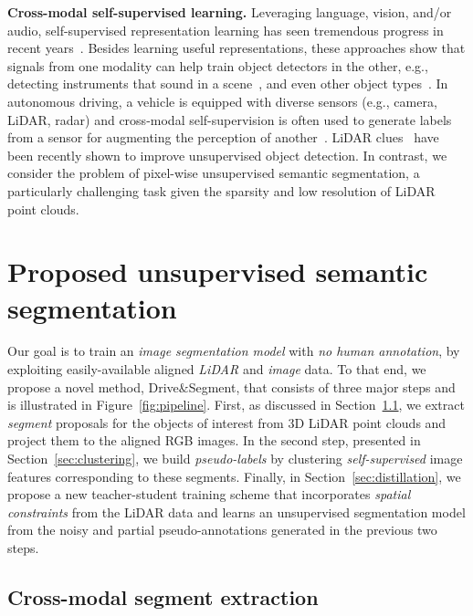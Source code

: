 \documentclass[runningheads]{llncs}
\newcommand{\ours}{Drive$\&$Segment\xspace}
\newcommand{\paragraphcustom}[1]{\smallskip\noindent\textbf{#1}}
\begin{document}
\paragraphcustom{Cross-modal self-supervised learning.}
Leveraging language, vision, and/or audio,  self-supervised representation learning has seen tremendous progress in recent years~\cite{alayrac2020self,alwassel_2020_xdc,arandjelovic2017look,miech2020end,owens2018audio,Recasens_2021_ICCV,zhao2018sound}. Besides learning useful representations, these approaches show that signals from one modality can help train object detectors in the other, e.g., detecting instruments that sound in a scene~\cite{chen2021localizing,owens2018audio,zhao2018sound}, and even other object types~\cite{afouras2021self}. In autonomous driving, a vehicle is equipped with diverse sensors (e.g., camera, LiDAR, radar) and cross-modal self-supervision is often used to generate labels from a sensor for augmenting the perception of another~\cite{bartoccioni2021lidartouch,jaritz2020xmuda,tian2021unsupervised,weston2019probably}. LiDAR clues~\cite{tian2021unsupervised} have been recently shown to improve unsupervised object detection. In contrast, we consider the problem of pixel-wise unsupervised semantic segmentation, a particularly challenging task given the sparsity and low resolution of LiDAR point clouds.
 
\section{Proposed unsupervised semantic segmentation}

Our goal is to train an \emph{image segmentation model} with \textit{no human annotation}, by exploiting easily-available aligned \emph{LiDAR} and \emph{image} data. 
To that end, we propose a novel method, \ours, that consists of three major steps and is illustrated in Figure~\ref{fig:pipeline}.
First, as discussed in Section~\ref{sec:segment_extraction}, we extract \emph{segment} proposals for the objects of interest from 3D LiDAR point clouds and project them to the aligned RGB images. In the second step, presented in Section~\ref{sec:clustering}, we build \emph{pseudo-labels} by clustering \emph{self-supervised} image features corresponding to these segments. Finally, in Section~\ref{sec:distillation}, we propose a new teacher-student training scheme that incorporates \emph{spatial constraints} from the LiDAR data and learns an unsupervised segmentation model from the noisy and partial pseudo-annotations generated in the previous two steps.

\subsection{Cross-modal segment extraction}
\label{sec:segment_extraction}
\end{document}
